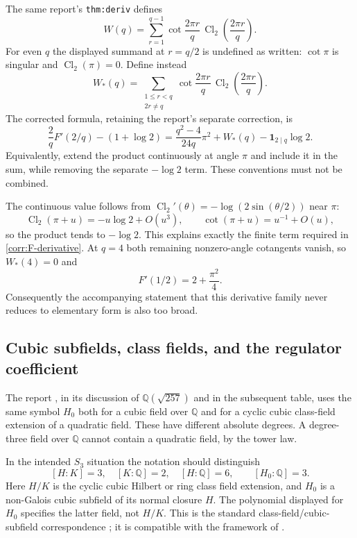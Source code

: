 \documentclass[11pt,a4paper]{article}
\theoremstyle{definition}
\theoremstyle{remark}
\numberwithin{equation}{section}
\begin{document}
The same report's \texttt{thm:deriv} defines
\[
 W(q)=\sum_{r=1}^{q-1}
       \cot\frac{2\pi r}{q}\,
       \operatorname{Cl}_2\left(\frac{2\pi r}{q}\right).
\]
For even $q$ the displayed summand at $r=q/2$ is undefined as written:
$\cot\pi$ is singular and $\operatorname{Cl}_2(\pi)=0$.
Define instead
\begin{equation}\label{corr:W-definition}
 W_*(q)=\sum_{\substack{1\leq r<q\\2r\ne q}}
       \cot\frac{2\pi r}{q}\,
       \operatorname{Cl}_2\left(\frac{2\pi r}{q}\right).
\end{equation}
The corrected formula, retaining the report's separate correction, is
\begin{equation}\label{corr:F-derivative}
 \frac2qF'(2/q)-(1+\log2)
    =\frac{q^2-4}{24q}\pi^2+W_*(q)
                                  -\mathbf1_{2\mid q}\log2.
\end{equation}
Equivalently, extend the product continuously at angle $\pi$ and
include it in the sum, while removing the separate $-\log2$ term.
These conventions must not be combined.

The continuous value follows from
$\operatorname{Cl}_2'(\theta)=-\log(2\sin(\theta/2))$ near $\pi$:
\[
 \operatorname{Cl}_2(\pi+u)=-u\log2+O(u^3),\qquad
 \cot(\pi+u)=u^{-1}+O(u),
\]
so the product tends to $-\log2$.  This explains exactly the finite
term required in \eqref{corr:F-derivative}.
At $q=4$ both remaining nonzero-angle cotangents vanish, so
$W_*(4)=0$ and
\begin{equation}\label{corr:F-derivative-half}
 F'(1/2)=2+\frac{\pi^2}{4}.
\end{equation}
Consequently the accompanying statement that this derivative family
never reduces to elementary form is also too broad.

\subsection{Cubic subfields, class fields, and the regulator coefficient}
\label{corr:stark-fields}

The report
, in its discussion of
$\mathbb Q(\sqrt{257})$ and in the subsequent table, uses the same
symbol $H_0$ both for a cubic field over $\mathbb Q$ and for a cyclic
cubic class-field extension of a quadratic field.  These have different
absolute degrees.  A degree-three field over $\mathbb Q$ cannot
contain a quadratic field, by the tower law.

In the intended $S_3$ situation the notation should distinguish
\[
 [H:K]=3,\quad[K:\mathbb Q]=2,\quad[H:\mathbb Q]=6,
 \qquad [H_0:\mathbb Q]=3.
\]
Here $H/K$ is the cyclic cubic Hilbert or ring class field extension,
and $H_0$ is a non-Galois cubic subfield of its normal closure $H$.
The polynomial displayed for $H_0$ specifies the latter field, not
$H/K$.  This is the standard class-field/cubic-subfield correspondence
\cite{MilneCFT}; it is compatible with the framework of
\cite{RadchenkoZagier2023}.
\end{document}
